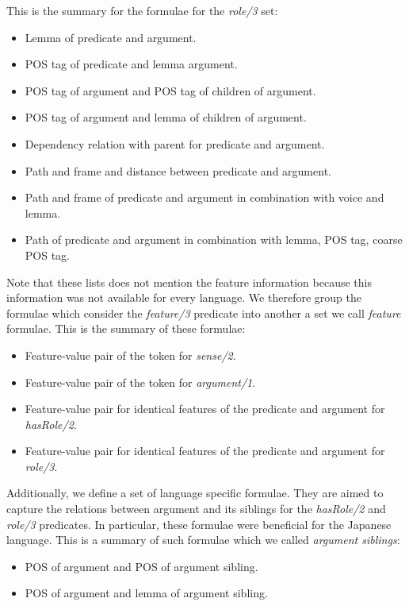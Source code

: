 This is the summary for the formulae for the \emph{role/3} set:
\begin{itemize}\addtolength{\itemsep}{-0.5\baselineskip}
    \item Lemma of predicate and argument.
    \item POS tag of predicate and lemma argument.
    \item POS tag of argument and POS tag of children of argument.
    \item POS tag of argument and lemma  of children of argument.
    \item Dependency relation with parent for predicate and argument.
    \item Path and frame and distance between predicate and argument.
    \item Path and frame of predicate and argument in combination with voice and 
        lemma.
    \item Path of predicate and argument in combination with lemma, POS tag, 
        coarse POS tag.
\end{itemize}

Note that these lists does not mention the feature information because 
this information was not available for every language. We therefore group the 
formulae which consider the \emph{feature/3} predicate into another a set we call 
\emph{feature} formulae. This is the summary of these formulae:
\begin{itemize}\addtolength{\itemsep}{-0.5\baselineskip}
    \item Feature-value pair of the token for \emph{sense/2}.
    \item Feature-value pair of the token for \emph{argument/1}.
    \item Feature-value pair for identical features of the predicate and argument 
        for \emph{hasRole/2}.
    \item Feature-value pair for identical features of the predicate and argument 
        for \emph{role/3}.
\end{itemize}

Additionally, we define a set of language specific formulae. They are aimed to 
capture the relations between argument and its siblings for the \emph{hasRole/2} 
and \emph{role/3} predicates.  In particular, these formulae were beneficial for 
the Japanese language.  This is a summary of such formulae which we called 
\emph{argument siblings}:
\begin{itemize}\addtolength{\itemsep}{-0.5\baselineskip}
    \item POS of argument and POS of argument sibling.
    \item POS of argument and lemma of argument sibling.
\end{itemize}

